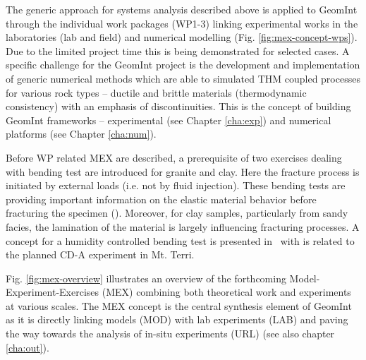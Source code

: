 The generic approach for systems analysis described above is applied to GeomInt through the individual work packages (WP1-3) linking experimental works in the laboratories (lab and field) and numerical modelling (Fig. \ref{fig:mex-concept-wps}). Due to the limited project time this is being demonstrated for selected cases. A specific challenge for the GeomInt project is the development and implementation of generic numerical methods which are able to simulated THM coupled processes for various rock types – ductile and brittle materials (thermodynamic consistency) with an emphasis of discontinuities. This is the concept of building GeomInt frameworks – experimental (see Chapter \ref{cha:exp}) and numerical platforms (see Chapter \ref{cha:num}).

Before WP related MEX are described, a prerequisite of two exercises dealing with bending test are introduced for granite and clay. Here the fracture process is initiated by external loads (i.e. not by fluid injection). These bending tests are providing important information on the elastic material behavior before fracturing the specimen (\MEXone). Moreover, for clay samples, particularly from sandy facies, the lamination of the material is largely influencing fracturing processes. A concept for a humidity controlled bending test is presented in \MEXthirteen~with is related to the planned CD-A experiment in Mt. Terri.


Fig. \ref{fig:mex-overview} illustrates an overview of the forthcoming Model-Experiment-Exercises (MEX) combining both theoretical work and experiments at various scales.
The MEX concept is the central synthesis element of GeomInt as it is directly linking models (MOD) with lab experiments (LAB) and paving the way towards the analysis of in-situ experiments (URL) (see also chapter \ref{cha:out}).

\clearpage

